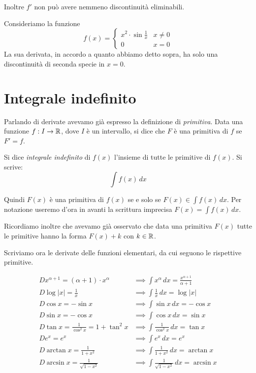 Inoltre $f'$ non può avere nemmeno discontinuità eliminabili.

\begin{example}
Consideriamo la funzione
\begin{equation*}
f(x) = \begin{cases}
x^2 \cdot \sin \frac{1}{x} & x \neq 0 \\
0 & x = 0
\end{cases}
\end{equation*}
La sua derivata, in accordo a quanto abbiamo detto sopra, ha solo una discontinuità di seconda specie in $x = 0$.
\end{example}

\section{Integrale indefinito}

Parlando di derivate avevamo già espresso la definizione di \emph{primitiva}. Data una funzione $f: I \to \mathbb R$, dove $I$ è un intervallo, si dice che $F$ è una primitiva di $f$ se $F' = f$.

\begin{definition}
Si dice \emph{integrale indefinito} di $f(x)$ l'insieme di tutte le primitive di $f(x)$. Si scrive:
\begin{equation*}
\int f(x)\, dx
\end{equation*}
\end{definition}

Quindi $F(x)$ è una primitiva di $f(x)$ se e solo se $F(x) \in \int f(x) \, dx$. Per notazione useremo d'ora in avanti la scrittura imprecisa $F(x) = \int f(x) \, dx$.

Ricordiamo inoltre che avevamo già osservato che data una primitiva $F(x)$ tutte le primitive hanno la forma $F(x) + k$ con $k \in \mathbb R$.

Scriviamo ora le derivate delle funzioni elementari, da cui seguono le rispettive primitive.

\begin{align*}
D x^{\alpha+1} = (\alpha+1) \cdot x^\alpha &\implies \int x^\alpha \, dx = \frac{x^{\alpha+1}}{\alpha+1} \\
D \log |x| = \frac{1}{x} &\implies \int \frac{1}{x} \, dx = \log |x| \\
D \cos x = -\sin x &\implies \int \sin x \, dx = -\cos x \\
D \sin x = -\cos x &\implies \int \cos x \, dx = \sin x\\
D \tan x = \frac{1}{\cos^2 x} = 1 + \tan^2 x &\implies \int \frac{1}{\cos^2 x} \, dx = \tan x \\
D e^x = e^x &\implies \int e^x \, dx = e^x \\
D \arctan x = \frac{1}{1+x^2} &\implies \int \frac{1}{1+x^2} \, dx = \arctan x \\
D \arcsin x = \frac{1}{\sqrt{1-x^2}} &\implies \int \frac{1}{\sqrt{1-x^2}}  \, dx = \arcsin x \\
\end{align*}

